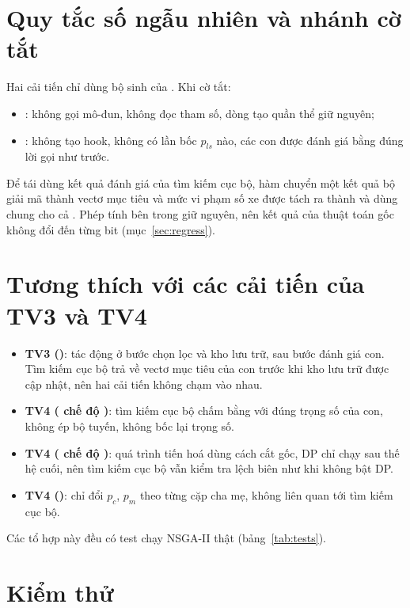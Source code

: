 \section{Quy tắc số ngẫu nhiên và nhánh cờ tắt}

Hai cải tiến chỉ dùng bộ sinh  của . Khi cờ tắt:
\begin{itemize}
  \item {}: không gọi mô-đun, không đọc tham số, dòng tạo quần thể giữ nguyên;
  \item {}: không tạo hook, không có lần bốc $p_{ls}$ nào, các con được đánh giá bằng
        đúng lời gọi  như trước.
\end{itemize}
Để tái dùng kết quả đánh giá của tìm kiếm cục bộ, hàm chuyển một kết quả bộ giải mã thành vectơ mục tiêu
và mức vi phạm số xe được tách ra thành  và dùng chung cho cả .
Phép tính bên trong giữ nguyên, nên kết quả của thuật toán gốc không đổi đến từng bit (mục~\ref{sec:regress}).

\section{Tương thích với các cải tiến của TV3 và TV4}

\begin{itemize}
  \item \textbf{TV3 ()}: tác động ở bước chọn lọc và kho lưu trữ, sau bước đánh giá con.
        Tìm kiếm cục bộ trả về vectơ mục tiêu của con trước khi kho lưu trữ được cập nhật, nên hai cải tiến
        không chạm vào nhau.
  \item \textbf{TV4 ( chế độ )}: tìm kiếm cục bộ chấm bằng
         với đúng trọng số của con, không ép bộ tuyến, không bốc lại trọng số.
  \item \textbf{TV4 ( chế độ )}: quá trình tiến hoá dùng cách cắt gốc, DP chỉ
        chạy sau thế hệ cuối, nên tìm kiếm cục bộ vẫn kiểm tra lệch biên như khi không bật DP.
  \item \textbf{TV4 ()}: chỉ đổi $p_c$, $p_m$ theo từng cặp cha mẹ, không liên quan
        tới tìm kiếm cục bộ.
\end{itemize}
Các tổ hợp này đều có test chạy NSGA-II thật (bảng~\ref{tab:tests}).

\section{Kiểm thử}

